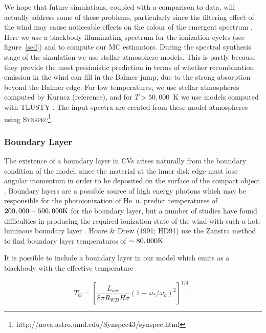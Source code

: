 \documentclass[preprint, a4paper, 11pt]{aastex}
\begin{document}
We hope that future simulations, coupled with a comparison to data, will 
actually address some of these problems, particularly since
the filtering effect of the wind may cause noticeable effects
on the colour of the emergent spectrum \citep{hassall}. 
Here we use a blackbody illuminating spectrum
for the ionization cycles (see figure~\ref{sed}) and to compute our MC estimators.
During the spectral synthesis stage of the simulation we use stellar atmosphere models.
This is partly because they provide the most pessimistic prediction in terms of whether recombination emission in the 
wind can fill in the Balmer jump, due to the strong absorption beyond the Balmer edge.
For low temperatures, we use stellar atmospheres computed 
by Kurucz (reference), and for $T>50,000$~K we use models computed with 
\textsc{TLUSTY} \citep{tlusty}. The input spectra are created from these model
atmospheres using \textsc{Synspec}\footnote{http://nova.astro.umd.edu/Synspec43/synspec.html}.



\subsubsection{Boundary Layer}
The existence of a boundary layer in CVs arises naturally from the boundary condition
of the \cite{shakurasunyaev1973} model, since the material at the inner disk
edge must lose angular momentum in order to be deposited on
the surface of the compact object \cite[see e.g.][]{lyndenbell1974}.
Boundary layers are a possible source of
high energy photons which may be responsible for the photoionization of 
He~\textsc{ii}. 
\cite{pringlesavonije1979} predict temperatures of 
$200,000-500,000{\rm K}$ for the boundary layer,
but a number of studies have found difficulties
in producing the required ionization state of the wind
with such a hot, luminous boundary layer 
\citep[see e.g.][]{maucheraymond1987, drewverbunt1985}.
Hoare \& Drew (1991; HD91) \nocite{hoare1991}
use the Zanstra method to find boundary layer temperatures of
$\sim80,000{\rm K}$


It is possible to include a boundary layer in our model which emits 
as a blackbody with the effective temperature

\begin{equation}
T_{bl} = \left[ \frac{L_{acc}}{8 \pi R_{WD} H \sigma} ( 1 - \omega_*/\omega_k)^2 \right]^{1/4},
\label{bl}
\end{equation}
\end{document}
